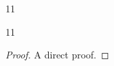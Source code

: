 \documentclass[paper=A4]{ropas-poster}
\begin{document}
\begin{postergrid}{1}{1}
\begin{posterblock}{1}{1}
\begin{proof}A direct proof.\end{proof}
\end{posterblock}
\end{postergrid}
\end{document}
